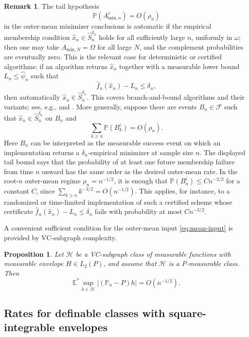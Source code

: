 \documentclass[11pt]{article}
\newtheorem{proposition}[theorem]{Proposition}\newtheorem{lemma}[theorem]{Lemma}\newtheorem{corollary}[theorem]{Corollary}\newtheorem{assumption}{Assumption}[section]\theoremstyle{definition}
\newtheorem{remark}[theorem]{Remark}
\begin{document}
\begin{remark}
The tail hypothesis
\[
\mathbb{P}(A_{\mathrm{min},n}^{c})=O(\rho_{n})
\]
in the outer-mean minimizer conclusions is automatic if the empirical
membership condition $\hat{x}_{n}\in\hat{S}_{n}^{\delta_{n}}$ holds
for all sufficiently large $n$, uniformly in $\omega$; then one may take $A_{\mathrm{min},N}=\Omega$
for all large $N$, and the complement probabilities are eventually zero.
This is the relevant case for deterministic or certified algorithms: if an
algorithm returns $\hat{x}_{n}$ together with a measurable lower bound
$L_{n}\le \hat{\psi}_{n}$ such that
\[
\hat{f}_{n}(\hat{x}_{n})-L_{n}\le \delta_{n},
\]
then automatically $\hat{x}_{n}\in\hat{S}_{n}^{\delta_{n}}$. This covers branch-and-bound algorithms and their variants; see, e.g., \citet[Chapter~5]{LocatelliSchoen2013} and \citet[Chapters~11--12]{Floudas2000}.
More generally, suppose there are events $B_{n}\in\mathcal{F}$ such that
$\hat{x}_{n}\in\hat{S}_{n}^{\delta_{n}}$ on $B_{n}$ and
\[
\sum_{k\ge n}\mathbb{P}(B_{k}^{c})=O(\rho_{n}).
\]
Here $B_{n}$ can be interpreted as the measurable success event on which
an implementation returns a $\delta_{n}$-empirical minimizer at sample
size $n$. The displayed tail bound says that the probability of at least
one future membership failure from time $n$ onward has the same order as
the desired outer-mean rate. In the root-$n$ outer-mean regime
$\rho_{n}=n^{-1/2}$, it is enough that
$\mathbb{P}(B_{n}^{c})\le Cn^{-3/2}$ for a constant $C$, since
$\sum_{k\ge n}k^{-3/2}=O(n^{-1/2})$. This applies, for instance, to a
randomized or time-limited implementation of such a certified scheme whose
certificate $\hat{f}_{n}(\hat{x}_{n})-L_{n}\le \delta_{n}$ fails with
probability at most $Cn^{-3/2}$.
\end{remark}

A convenient sufficient condition for the outer-mean input \eqref{eq:mean-input}
is provided by VC-subgraph complexity.

\begin{proposition}\label{prop:vc-mean}
Let $\mathcal{H}$ be a VC-subgraph class of measurable functions with
measurable envelope $H\in L_{2}(P)$, and assume that $\mathcal{H}$ is a
$P$-measurable class.
Then 
\begin{equation}
\mathbb{E}^{*}\sup_{h\in\mathcal{H}}\lvert(\mathbb{P}_{n}-P)h\rvert=O(n^{-1/2}).\label{eq:vc-mean}
\end{equation}
\end{proposition}

\subsection{Rates for definable classes with square-integrable envelopes}
\end{document}
